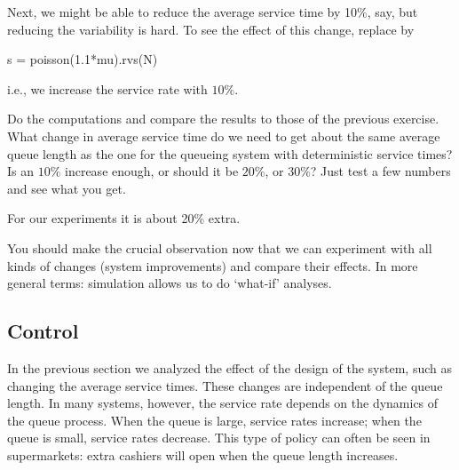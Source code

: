 \begin{exercise}
  Next, we might be able to reduce the average service time by 10\%, say, but reducing the variability is hard. To see the effect of this change, replace  by
  \begin{pyverbatim}
s = poisson(1.1*mu).rvs(N)    
  \end{pyverbatim}
i.e., we increase the service rate with $10\%$. 

Do the computations and compare the results to those of the previous exercise. What change in average service time do we need to get about the same average queue length as the one for the queueing system with deterministic service times? Is an $10\%$ increase enough, or should it be $20\%$, or $30\%$? Just test a few numbers and see what you get. 
  \begin{solution}
For our experiments it is about 20\% extra.
  \end{solution}
\end{exercise}

You should make the crucial observation now that we can experiment with all kinds of changes (system improvements) and compare their effects. In more general terms: simulation allows us to do `what-if' analyses. 

\subsection{Control }
\label{sec:control-}

In the previous section we analyzed the effect of the design of the system, such as changing the average service times.
These changes are independent of the queue length.
In many systems, however, the service rate depends on the dynamics of the queue process.
When the queue is large, service rates increase; when the queue is small, service rates decrease.
This type of policy can often be seen in supermarkets: extra cashiers will open when the queue length increases.

